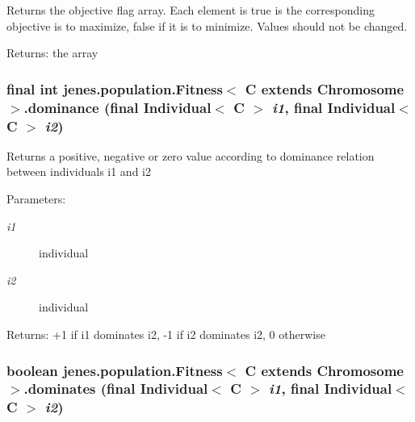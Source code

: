 Returns the objective flag array. Each element is true is the corresponding objective is to maximize, false if it is to minimize. Values should not be changed.

\begin{Desc}
\item[Returns:]the array \end{Desc}
\hypertarget{classjenes_1_1population_1_1_fitness_3_01_c_01extends_01_chromosome_01_4_2027cd00c84c69e1819236ad488a5ab9}{
\subsubsection[dominance]{\setlength{\rightskip}{0pt plus 5cm}final int jenes.population.Fitness$<$ C extends Chromosome $>$.dominance (final Individual$<$ C $>$ {\em i1}, \/  final Individual$<$ C $>$ {\em i2})}}
\label{classjenes_1_1population_1_1_fitness_3_01_c_01extends_01_chromosome_01_4_2027cd00c84c69e1819236ad488a5ab9}


Returns a positive, negative or zero value according to dominance relation between individuals i1 and i2

\begin{Desc}
\item[Parameters:]
\begin{description}
\item[{\em i1}]individual \item[{\em i2}]individual \end{description}
\end{Desc}
\begin{Desc}
\item[Returns:]+1 if i1 dominates i2, -1 if i2 dominates i2, 0 otherwise \end{Desc}
\hypertarget{classjenes_1_1population_1_1_fitness_3_01_c_01extends_01_chromosome_01_4_afc7666adbe84d7683f1de729b1a3ca5}{
\subsubsection[dominates]{\setlength{\rightskip}{0pt plus 5cm}boolean jenes.population.Fitness$<$ C extends Chromosome $>$.dominates (final Individual$<$ C $>$ {\em i1}, \/  final Individual$<$ C $>$ {\em i2})}}
\label{classjenes_1_1population_1_1_fitness_3_01_c_01extends_01_chromosome_01_4_afc7666adbe84d7683f1de729b1a3ca5}


